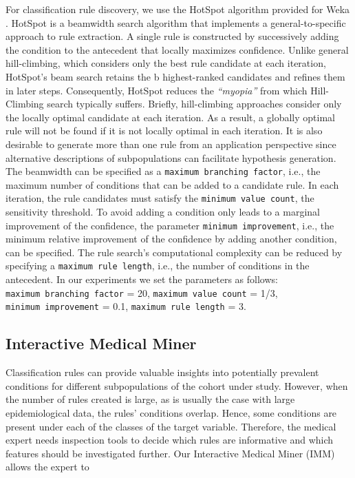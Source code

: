 \documentclass[
  oneside]{book}
\begin{document}
For classification rule discovery, we use the HotSpot \autocite{hotspot2012} algorithm provided for Weka \autocite{FrankEtAl:Weka2016}.
HotSpot is a beamwidth search algorithm that implements a general-to-specific approach to rule extraction.
A single rule is constructed by successively adding the condition to the antecedent that locally maximizes confidence.
Unlike general hill-climbing, which considers only the best rule candidate at each iteration, HotSpot's beam search retains the b highest-ranked candidates and refines them in later steps.
Consequently, HotSpot reduces the \emph{``myopia''} \autocite{Fuernkranz:12} from which Hill-Climbing search typically suffers.
Briefly, hill-climbing approaches consider only the locally optimal candidate at each iteration.
As a result, a globally optimal rule will not be found if it is not locally optimal in each iteration.
It is also desirable to generate more than one rule from an application perspective since alternative descriptions of subpopulations can facilitate hypothesis generation.
The beamwidth can be specified as a \texttt{maximum\ branching\ factor}, i.e., the maximum number of conditions that can be added to a candidate rule.
In each iteration, the rule candidates must satisfy the \texttt{minimum\ value\ count}, the sensitivity threshold.
To avoid adding a condition only leads to a marginal improvement of the confidence, the parameter \texttt{minimum\ improvement}, i.e., the minimum relative improvement of the confidence by adding another condition, can be specified.
The rule search's computational complexity can be reduced by specifying a \texttt{maximum\ rule\ length}, i.e., the number of conditions in the antecedent.
In our experiments we set the parameters as follows: \texttt{maximum\ branching\ factor} = 20, \texttt{maximum\ value\ count} = 1/3, \texttt{minimum\ improvement} = 0.1, \texttt{maximum\ rule\ length} = 3.

\hypertarget{imm-workflow-imm}{%
\subsection{Interactive Medical Miner}\label{imm-workflow-imm}}

Classification rules can provide valuable insights into potentially prevalent conditions for different subpopulations of the cohort under study.
However, when the number of rules created is large, as is usually the case with large epidemiological data, the rules' conditions overlap.
Hence, some conditions are present under each of the classes of the target variable.
Therefore, the medical expert needs inspection tools to decide which rules are informative and which features should be investigated further.
Our Interactive Medical Miner (IMM) allows the expert to
\end{document}
